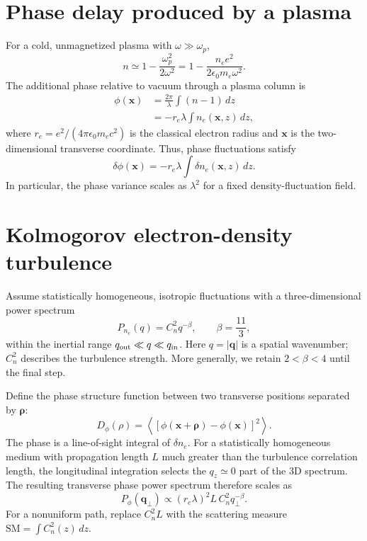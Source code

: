 \section{Phase delay produced by a plasma}
For a cold, unmagnetized plasma with $\omega\gg\omega_p$,
\begin{equation}
n\simeq 1-\frac{\omega_p^2}{2\omega^2}
=1-\frac{n_e e^2}{2\epsilon_0m_e\omega^2}.
\end{equation}
The additional phase relative to vacuum through a plasma column is
\begin{align}
\phi(\mathbf{x})&=\frac{2\pi}{\lambda}\int(n-1)\,dz\\
&=-r_e\lambda\int n_e(\mathbf{x},z)\,dz,
\end{align}
where $r_e=e^2/(4\pi\epsilon_0m_ec^2)$ is the classical electron radius and $\mathbf{x}$ is the two-dimensional transverse coordinate. Thus, phase fluctuations satisfy
\begin{equation}
\boxed{\delta\phi(\mathbf{x})=-r_e\lambda\int\delta n_e(\mathbf{x},z)\,dz.}
\end{equation}
In particular, the phase variance scales as $\lambda^2$ for a fixed density-fluctuation field.

\section{Kolmogorov electron-density turbulence}
Assume statistically homogeneous, isotropic fluctuations with a three-dimensional power spectrum
\begin{equation}
\boxed{P_{n_e}(q)=C_n^2q^{-\beta},\qquad \beta=\frac{11}{3},}
\end{equation}
within the inertial range $q_{\rm out}\ll q\ll q_{\rm in}$. Here $q=|\mathbf q|$ is a spatial wavenumber; $C_n^2$ describes the turbulence strength. More generally, we retain $2<\beta<4$ until the final step.

Define the phase structure function between two transverse positions separated by $\boldsymbol\rho$:
\begin{equation}
D_\phi(\rho)=\left\langle\left[\phi(\mathbf{x}+\boldsymbol\rho)-\phi(\mathbf{x})\right]^2\right\rangle.
\end{equation}
The phase is a line-of-sight integral of $\delta n_e$. For a statistically homogeneous medium with propagation length $L$ much greater than the turbulence correlation length, the longitudinal integration selects the $q_z\simeq0$ part of the 3D spectrum. The resulting transverse phase power spectrum therefore scales as
\begin{equation}
P_\phi(\mathbf q_\perp)\propto (r_e\lambda)^2 L\,C_n^2 q_\perp^{-\beta}.
\end{equation}
For a nonuniform path, replace $C_n^2L$ with the scattering measure $\mathrm{SM}=\int C_n^2(z)\,dz$.

